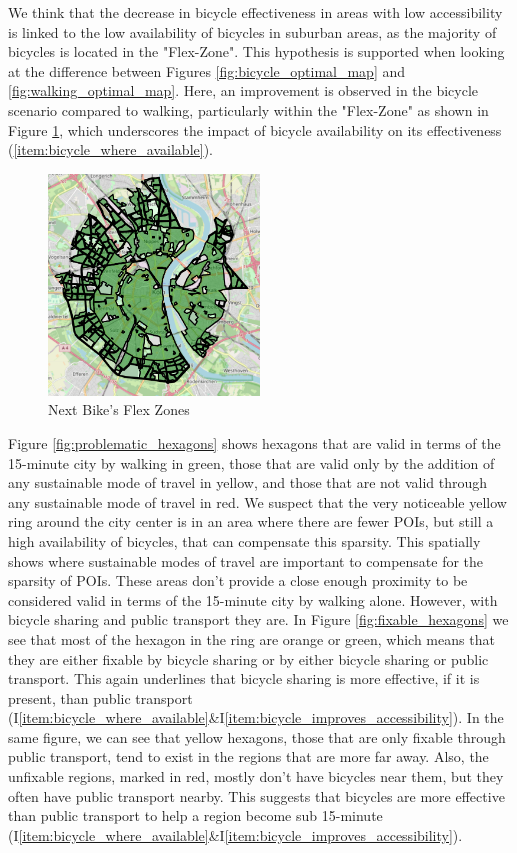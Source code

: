We think that the decrease in bicycle effectiveness in areas with low accessibility is linked to the low availability of bicycles in suburban areas, as the majority of bicycles is located in the "Flex-Zone".
This hypothesis is supported when looking at the difference between Figures \ref{fig:bicycle_optimal_map} and \ref{fig:walking_optimal_map}. 
Here, an improvement is observed in the bicycle scenario compared to walking, particularly within the "Flex-Zone" as shown in Figure \ref{fig:flex_zones}, which underscores the impact of bicycle availability on its effectiveness (\ref{item:bicycle_where_available}).
\begin{figure}
  \begin{center}
    \includegraphics[width=0.50\textwidth]{Figures/discussion/flex_zones.png}
  \end{center}
  \caption{Next Bike's Flex Zones}
  \label{fig:flex_zones}
\end{figure}

Figure \ref{fig:problematic_hexagons} shows hexagons that are valid in terms of the 15-minute city by walking in green, those that are valid only by the addition of any sustainable mode of travel in yellow, and those that are not valid through any sustainable mode of travel in red.
We suspect that the very noticeable yellow ring around the city center is in an area where there are fewer POIs, but still a high availability of bicycles, that can compensate this sparsity.
This spatially shows where sustainable modes of travel are important to compensate for the sparsity of POIs.
These areas don't provide a close enough proximity to be considered valid in terms of the 15-minute city by walking alone.
However, with bicycle sharing and public transport they are.
In Figure \ref{fig:fixable_hexagons} we see that most of the hexagon in the ring are orange or green, which means that they are either fixable by bicycle sharing or by either bicycle sharing or public transport.
This again underlines that bicycle sharing is more effective, if it is present, than public transport (I\ref{item:bicycle_where_available}\&I\ref{item:bicycle_improves_accessibility}).
In the same figure, we can see that yellow hexagons, those that are only fixable through public transport, tend to exist in the regions that are more far away.
Also, the unfixable regions, marked in red,  mostly don't have bicycles near them, but they often have public transport nearby.
This suggests that bicycles are more effective than public transport to help a region become sub 15-minute (I\ref{item:bicycle_where_available}\&I\ref{item:bicycle_improves_accessibility}).

